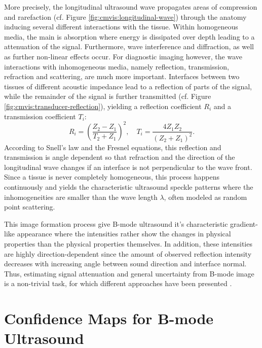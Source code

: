 More precisely, the longitudinal ultrasound wave propagates areas of compression and rarefaction (cf. Figure \ref{fig:cmvis:longitudinal-wave}) through the anatomy inducing several different interactions with the tissue.
Within homogeneous media, the main  is absorption where energy is dissipated over depth leading to a  attenuation of the signal.
Furthermore, wave interference and diffraction, as well as further non-linear effects occur.
For diagnostic imaging however, the wave interactions with inhomogeneous media, namely reflection, transmission, refraction and scattering, are much more important.
Interfaces between two tissues of different acoustic impedance lead to a reflection of parts of the signal, while the remainder of the signal is further transmitted (cf. Figure \ref{fig:cmvis:transducer-reflection}), yielding a reflection coefficient $R_i$ and a transmission coefficient $T_i$:
\begin{equation}
	\label{eq:cudacm:reflection-transmission-coefficients}
	R_i	= \left( \frac{Z_2 - Z_1}{T_2 + Z_1} \right)^2, \quad
	T_i	= \frac{4Z_1 Z_2}{\left( Z_2 + Z_1 \right)^2}.
\end{equation}
According to Snell's law and the Fresnel equations, this reflection and transmission is angle dependent so that refraction  and the direction of the longitudinal wave changes if an interface is not perpendicular to the wave front.
Since a tissue is never completely homogeneous, this process happens continuously and yields the characteristic ultrasound speckle patterns where the inhomogeneities are smaller than the wave length $\lambda$, often modeled as random point scattering.

This image formation process give B-mode ultrasound it's characteristic gradient-like appearance where the intensities rather show the changes in physical properties than the physical properties themselves.
In addition, these intensities are highly direction-dependent since the amount of observed reflection intensity decreases with increasing angle between sound direction and interface normal.
Thus, estimating signal attenuation and general uncertainty from B-mode image is a non-trivial task, for which different approaches have been presented \cite{Noble:2010:Ultrasound, Noble:2011:Ultrasound}.


\section{Confidence Maps for B-mode Ultrasound}
\label{sec:cudacm:cm}

